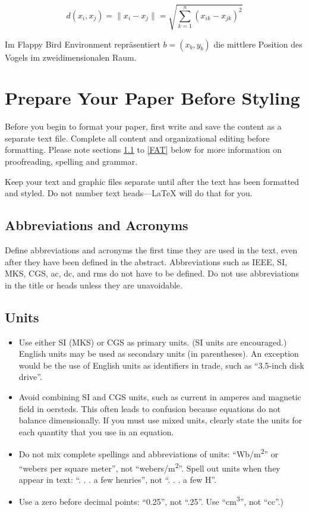 \documentclass[conference]{IEEEtran}
\begin{document}
\begin{equation}
	d(x_i, x_j) = \|x_i - x_j\| = \sqrt{ \sum_{k=1}^{n} (x_{ik} - x_{jk})^2 }
	\label{eq:euklidische_distanz}
\end{equation}

Im Flappy Bird Environment repräsentiert \( b = (x_b, y_b) \) die mittlere Position des Vogels im zweidimensionalen Raum.


\section{Prepare Your Paper Before Styling}
Before you begin to format your paper, first write and save the content as a 
separate text file. Complete all content and organizational editing before 
formatting. Please note sections \ref{AA} to \ref{FAT} below for more information on 
proofreading, spelling and grammar.

Keep your text and graphic files separate until after the text has been 
formatted and styled. Do not number text heads---{\LaTeX} will do that 
for you.

\subsection{Abbreviations and Acronyms}\label{AA}
Define abbreviations and acronyms the first time they are used in the text, 
even after they have been defined in the abstract. Abbreviations such as 
IEEE, SI, MKS, CGS, ac, dc, and rms do not have to be defined. Do not use 
abbreviations in the title or heads unless they are unavoidable.

\subsection{Units}
\begin{itemize}
\item Use either SI (MKS) or CGS as primary units. (SI units are encouraged.) English units may be used as secondary units (in parentheses). An exception would be the use of English units as identifiers in trade, such as ``3.5-inch disk drive''.
\item Avoid combining SI and CGS units, such as current in amperes and magnetic field in oersteds. This often leads to confusion because equations do not balance dimensionally. If you must use mixed units, clearly state the units for each quantity that you use in an equation.
\item Do not mix complete spellings and abbreviations of units: ``Wb/m\textsuperscript{2}'' or ``webers per square meter'', not ``webers/m\textsuperscript{2}''. Spell out units when they appear in text: ``. . . a few henries'', not ``. . . a few H''.
\item Use a zero before decimal points: ``0.25'', not ``.25''. Use ``cm\textsuperscript{3}'', not ``cc''.)
\end{itemize}
\end{document}
